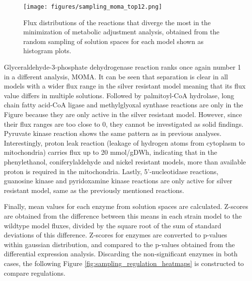 \begin{figure}[H]
  \begin{center}
  \texttt{[image: figures/sampling\_moma\_top12.png]}
  \caption[Flux distributions of the reactions that diverge the most in the minimization of metabolic adjustment analysis, obtained from the random sampling of solution spaces for each model shown as histogram plots]{Flux distributions of the reactions that diverge the most in the minimization of metabolic adjustment analysis, obtained from the random sampling of solution spaces for each model shown as histogram plots.}
  \label{fig:sampling_moma_top12}
  \end{center}
\end{figure}

Glyceraldehyde-3-phosphate dehydrogenase reaction ranks once again number 1 in a different analysis, MOMA. It can be seen that separation is clear in all models with a wider flux range in the silver resistant model meaning that its flux value differs in multiple solutions. Followed by palmitoyl-CoA hydrolase, long chain fatty acid-CoA ligase and methylglyoxal synthase reactions are only in the Figure because they are only active in the silver resistant model. However, since their flux ranges are too close to 0, they cannot be investigated as solid findings. Pyruvate kinase reaction shows the same pattern as in previous analyses. Interestingly, proton leak reaction (leakage of hydrogen atoms from cytoplasm to mitochondria) carries flux up to 20 mmol/gDWh, indicating that in the phenylethanol, coniferylaldehyde and nickel resistant models, more than available proton is required in the mitochondria. Lastly, 5'-nucleotidase reactions, guanosine kinase and pyridoxamine kinase reactions are only active for silver resistant model, same as the previously mentioned reactions.

Finally, mean values for each enzyme from solution spaces are calculated. Z-scores are obtained from the difference between this means in each strain model to the wildtype model fluxes, divided by the square root of the sum of standard deviations of this difference. Z-scores for enzymes are converted to p-values within gaussian distribution, and compared to the p-values obtained from the differential expression analysis. Discarding the non-significant enzymes in both cases, the following Figure \ref{fig:sampling_regulation_heatmaps} is constructed to compare regulations.

